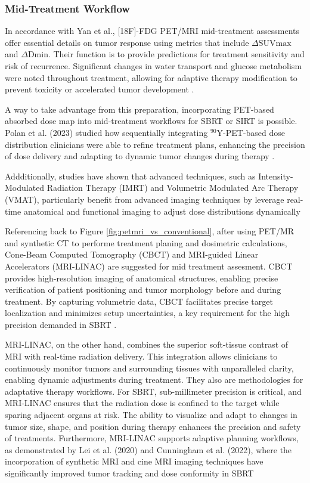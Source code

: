 \begin{multicols}{2}
\subsubsection{Mid-Treatment Workflow}

In accordance with Yan et al., [18F]-FDG PET/MRI mid-treatment assessments offer essential details on tumor response using metrics that include $\Delta \text{SUVmax}$ and $\Delta \text{Dmin}$. Their function is to provide predictions for treatment sensitivity and risk of recurrence. Significant changes in water transport and glucose metabolism were noted throughout treatment, allowing for adaptive therapy modification to prevent toxicity or accelerated tumor development \cite{yan2024}.  

A way to take advantage from this preparation, incorporating PET-based absorbed dose map into mid-treatment workflows for SBRT or SIRT is possible. Polan et al. (2023) studied how sequentially integrating $^{90}\text{Y}$-PET-based dose distribution clinicians were able to refine treatment plans, enhancing the precision of dose delivery and adapting to dynamic tumor changes during therapy \cite{Polan2023}. 

Addditionally, studies have shown that  advanced techniques, such as Intensity-Modulated Radiation Therapy (IMRT) and Volumetric Modulated Arc Therapy (VMAT), particularly benefit from advanced imaging techniques by leverage real-time anatomical and functional imaging to adjust dose distributions dynamically \cite{Hunte2022}%

Referencing back to Figure \ref{fig:petmri_vs_conventional}, after using PET/MR and synthetic CT to performe treatment planing and dosimetric calculations, Cone-Beam Computed Tomography (CBCT) and MRI-guided Linear Accelerators (MRI-LINAC) are suggested for mid treatment assesment. CBCT provides high-resolution imaging of anatomical structures, enabling precise verification of patient positioning and tumor morphology before and during treatment. By capturing volumetric data, CBCT facilitates precise target localization and minimizes setup uncertainties, a key requirement for the high precision demanded in SBRT \cite{Srinivasan2014}.

MRI-LINAC, on the other hand, combines the superior soft-tissue contrast of MRI with real-time radiation delivery. This integration allows clinicians to continuously monitor tumors and surrounding tissues with unparalleled clarity, enabling dynamic adjustments during treatment. They also are methodologies for adaptative therapy workflows. For SBRT, sub-millimeter precision is critical,  and MRI-LINAC ensures that the radiation dose is confined to the target while sparing adjacent organs at risk. The ability to visualize and adapt to changes in tumor size, shape, and position during therapy enhances the precision and safety of treatments. Furthermore, MRI-LINAC supports adaptive planning workflows, as demonstrated by Lei et al. (2020) and Cunningham et al. (2022), where the incorporation of synthetic MRI and cine MRI imaging techniques have significantly improved tumor tracking and dose conformity in SBRT \cite{Lei2020}%
\end{multicols}